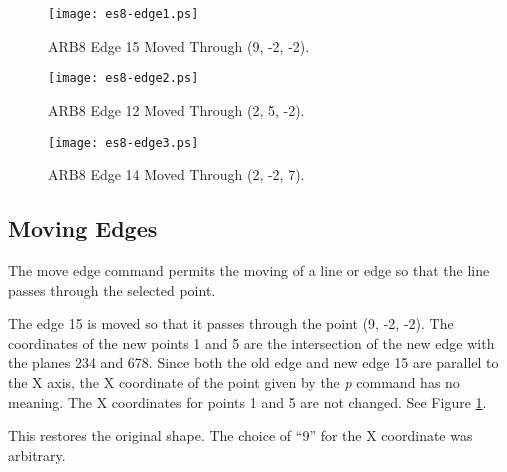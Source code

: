 
\begin{figure}
\centering \texttt{[image: es8-edge1.ps]}
\caption{ARB8 Edge 15 Moved Through (9, -2, -2).}
\label{es8-edge1}
\end{figure}

\begin{figure}
\centering \texttt{[image: es8-edge2.ps]}
\caption{ARB8 Edge 12 Moved Through (2, 5, -2).}
\label{es8-edge2}
\end{figure}

\begin{figure}
\centering \texttt{[image: es8-edge3.ps]}
\caption{ARB8 Edge 14 Moved Through (2, -2, 7).}
\label{es8-edge3}
\end{figure}

\subsection{Moving Edges}

The move edge command permits the moving of a line or edge so that the
line passes through the selected point.


The edge 15 is moved so that it passes through the point (9, -2, -2).  The
coordinates of the new points 1 and 5 are the intersection of the new edge
with the planes 234 and 678.  Since both the old edge and new edge 15 are
parallel to the X axis,
the X coordinate of the point given by the {\em p} command
has no meaning.  The X coordinates for points 1 and 5 are not changed.
See Figure \ref{es8-edge1}.


This restores the original shape.
The choice of ``9'' for the X coordinate was arbitrary.


